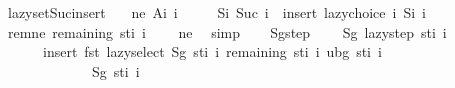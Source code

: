 \begin{isabellebody}
%
\endisatagproof
{\isafoldproof}%
%
\isadelimproof
\isanewline
%
\endisadelimproof
\isanewline
{}\isamarkupfalse%
\ lazy{\isacharunderscore}{\kern0pt}set{\isacharunderscore}{\kern0pt}Suc{\isacharunderscore}{\kern0pt}insert{\isacharcolon}{\kern0pt}\isanewline
\ \ \ ne{\isacharcolon}{\kern0pt}\ {\isachardoublequoteopen}A{\isacharunderscore}{\kern0pt}i\ i\ {\isasymnoteq}\ {\isacharbraceleft}{\kern0pt}{\isacharbraceright}{\kern0pt}{\isachardoublequoteclose}\isanewline
\ \ \ {\isachardoublequoteopen}S{\isacharunderscore}{\kern0pt}i\ {\isacharparenleft}{\kern0pt}Suc\ i{\isacharparenright}{\kern0pt}\ {\isacharequal}{\kern0pt}\ insert\ {\isacharparenleft}{\kern0pt}lazy{\isacharunderscore}{\kern0pt}choice\ i{\isacharparenright}{\kern0pt}\ {\isacharparenleft}{\kern0pt}S{\isacharunderscore}{\kern0pt}i\ i{\isacharparenright}{\kern0pt}{\isachardoublequoteclose}\isanewline
%
\isadelimproof
%
\endisadelimproof
%
\isatagproof
{}\isamarkupfalse%
\ {\isacharminus}{\kern0pt}\isanewline
\ \ \isamarkupfalse%
\ rem{\isacharunderscore}{\kern0pt}ne{\isacharcolon}{\kern0pt}\ {\isachardoublequoteopen}remaining\ {\isacharparenleft}{\kern0pt}st{\isacharunderscore}{\kern0pt}i\ i{\isacharparenright}{\kern0pt}\ {\isasymnoteq}\ {\isacharbraceleft}{\kern0pt}{\isacharbraceright}{\kern0pt}{\isachardoublequoteclose}\ \isamarkupfalse%
\ ne\ \isamarkupfalse%
\ simp\isanewline
\ \ \isamarkupfalse%
\ Sg{\isacharunderscore}{\kern0pt}step{\isacharcolon}{\kern0pt}\isanewline
\ \ \ \ {\isachardoublequoteopen}Sg\ {\isacharparenleft}{\kern0pt}lazy{\isacharunderscore}{\kern0pt}step\ {\isacharparenleft}{\kern0pt}st{\isacharunderscore}{\kern0pt}i\ i{\isacharparenright}{\kern0pt}{\isacharparenright}{\kern0pt}\ {\isacharequal}{\kern0pt}\isanewline
\ \ \ \ \ \ insert\ {\isacharparenleft}{\kern0pt}fst\ {\isacharparenleft}{\kern0pt}lazy{\isacharunderscore}{\kern0pt}select\ {\isacharparenleft}{\kern0pt}Sg\ {\isacharparenleft}{\kern0pt}st{\isacharunderscore}{\kern0pt}i\ i{\isacharparenright}{\kern0pt}{\isacharparenright}{\kern0pt}\ {\isacharparenleft}{\kern0pt}remaining\ {\isacharparenleft}{\kern0pt}st{\isacharunderscore}{\kern0pt}i\ i{\isacharparenright}{\kern0pt}{\isacharparenright}{\kern0pt}\ {\isacharparenleft}{\kern0pt}ubg\ {\isacharparenleft}{\kern0pt}st{\isacharunderscore}{\kern0pt}i\ i{\isacharparenright}{\kern0pt}{\isacharparenright}{\kern0pt}{\isacharparenright}{\kern0pt}{\isacharparenright}{\kern0pt}\isanewline
\ \ \ \ \ \ \ \ \ \ \ \ \ {\isacharparenleft}{\kern0pt}Sg\ {\isacharparenleft}{\kern0pt}st{\isacharunderscore}{\kern0pt}i\ i{\isacharparenright}{\kern0pt}{\isacharparenright}{\kern0pt}{\isachardoublequoteclose}\isanewline

\end{isabellebody}
